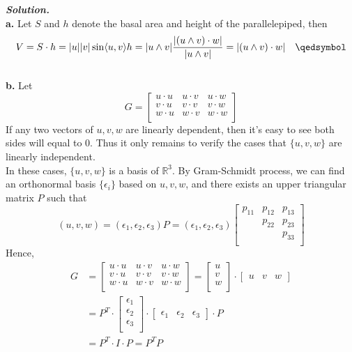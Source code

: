 \documentclass{article}
\begin{document}
\par
\textbf{\textit{Solution.}}\\
\textbf{a. }Let $S$ and $h$ denote the basal area and height of the parallelepiped, then
$$
    V = S \cdot h = |u||v|\sin \langle u,v \rangle h = |u \wedge v|\frac{|(u \wedge v) \cdot w|}{|u \wedge v|} = |(u \wedge v) \cdot w|
    \quad \qedsymbol
$$\\
\textbf{b. }Let
$$
    G = 
    \left[\begin{array}{ccc} 
        u \cdot u & u \cdot v & u \cdot w \\ 
        v \cdot u & v \cdot v & v \cdot w \\ 
        w \cdot u & w \cdot v & w \cdot w \\ 
    \end{array}\right]
$$
If any two vectors of $u, v, w$ are linearly dependent, then it's easy to see both sides will equal to 0. Thus it only remains to verify the cases that $\{u, v, w\}$
are linearly independent.\\
In these cases, $\{u,v,w\}$ is a basis of $\mathbb{R}^3$. By Gram-Schmidt process, we can find an orthonormal basis
$\{\epsilon_i\}$ based on $u,v,w$, and there exists an upper triangular matrix $P$ such that
$$
    (u,v,w) = (\epsilon_1, \epsilon_2, \epsilon_3) P = (\epsilon_1, \epsilon_2, \epsilon_3)
    \left[\begin{array}{ccc} 
        p_{11} & p_{12} & p_{13} \\ 
         & p_{22} & p_{23} \\ 
         &  & p_{33} \\ 
    \end{array}\right]
$$
Hence,
$$
\begin{aligned}
    G &= 
    \left[\begin{array}{ccc} 
        u \cdot u & u \cdot v & u \cdot w \\ 
        v \cdot u & v \cdot v & v \cdot w \\ 
        w \cdot u & w \cdot v & w \cdot w \\ 
    \end{array}\right]
    = 
    \left[\begin{array}{c} 
        u\\ 
        v\\ 
        w\\ 
    \end{array}\right] \cdot
    \left[\begin{array}{ccc}
        u & v & w
    \end{array}\right]\\
    &= P^T \cdot 
    \left[\begin{array}{c} 
        \epsilon_1\\ 
        \epsilon_2\\ 
        \epsilon_3\\ 
    \end{array}\right] \cdot
    \left[\begin{array}{ccc}
        \epsilon_1 & \epsilon_2 & \epsilon_3
    \end{array}\right] \cdot P \\
    &= P^T \cdot I \cdot P = P^TP
\end{aligned}
$$
\end{document}
